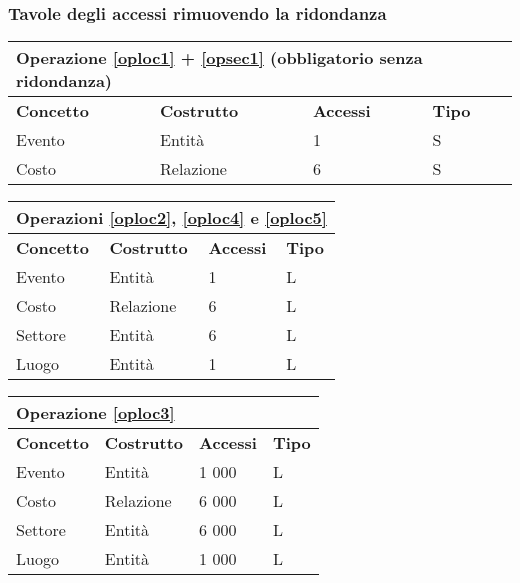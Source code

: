 \documentclass[a4paper,11pt]{article}
\begin{document}
\subsubsection*{Tavole degli accessi rimuovendo la ridondanza}

\begin{tabularx}{\textwidth}{|X|X|X|X|}
\hline
  \multicolumn{4}{|l|}{\textbf{Operazione \ref{oploc1} + \ref{opsec1} (obbligatorio senza ridondanza)}} \\
\hline
\textbf{Concetto} & \textbf{Costrutto} & \textbf{Accessi} & \textbf{Tipo}\\
\hline
Evento & Entità & 1 & S \\
\hline
Costo & Relazione & 6 & S \\
\hline
\end{tabularx}
\newline
\vspace*{1em}
\newline
\begin{tabularx}{\textwidth}{|X|X|X|X|}
\hline
  \multicolumn{4}{|l|}{\textbf{Operazioni \ref{oploc2}, \ref{oploc4} e \ref{oploc5}}} \\
\hline
\textbf{Concetto} & \textbf{Costrutto} & \textbf{Accessi} & \textbf{Tipo}\\
\hline
Evento & Entità & 1 & L \\
\hline
Costo & Relazione & 6 & L \\
\hline
Settore & Entità & 6 & L \\
\hline
Luogo & Entità & 1 & L \\
\hline
\end{tabularx}
\newline
\vspace*{1em}
\newline
\begin{tabularx}{\textwidth}{|X|X|X|X|}
\hline
  \multicolumn{4}{|l|}{\textbf{Operazione \ref{oploc3}}} \\
\hline
\textbf{Concetto} & \textbf{Costrutto} & \textbf{Accessi} & \textbf{Tipo}\\
\hline
Evento & Entità & 1 000 & L \\
\hline
Costo & Relazione & 6 000 & L \\
\hline
Settore & Entità & 6 000 & L \\
\hline
Luogo & Entità & 1 000 & L \\
\hline
\end{tabularx}
\newline
\vspace*{1em}
\end{document}
